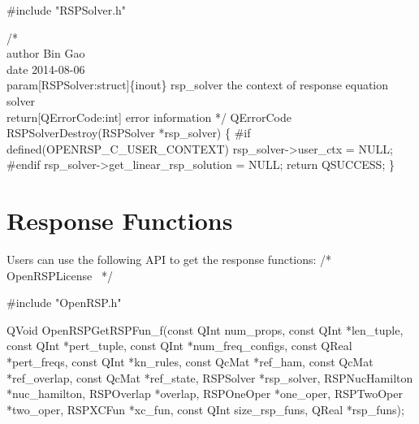 #include "RSPSolver.h"

/*%
    \\author Bin Gao
    \\date 2014-08-06
    \\param[RSPSolver:struct]\{inout\} rsp_solver the context of response equation solver
    \\return[QErrorCode:int] error information
*/
QErrorCode RSPSolverDestroy(RSPSolver *rsp_solver)
\{
#if defined(OPENRSP_C_USER_CONTEXT)
    rsp_solver->user_ctx = NULL;
#endif
    rsp_solver->get_linear_rsp_solution = NULL;
    return QSUCCESS;
\}

\nwendcode{}\section{Response Functions}
\label{section-OpenRSP-RSPFun}

Users can use the following API to get the response functions:
\nwenddocs{}\endmoddef
/*
  \LA{}OpenRSPLicense~{\nwtagstyle{}}\RA{}
*/

#include "OpenRSP.h"

QVoid OpenRSPGetRSPFun_f(const QInt num_props,
                         const QInt *len_tuple,
                         const QInt *pert_tuple,
                         const QInt *num_freq_configs,
                         const QReal *pert_freqs,
                         const QInt *kn_rules,
                         const QcMat *ref_ham,
                         const QcMat *ref_overlap,
                         const QcMat *ref_state,
                         RSPSolver *rsp_solver,
                         RSPNucHamilton *nuc_hamilton,
                         RSPOverlap *overlap,
                         RSPOneOper *one_oper,
                         RSPTwoOper *two_oper,
                         RSPXCFun *xc_fun,
                         const QInt size_rsp_funs,
                         QReal *rsp_funs);

